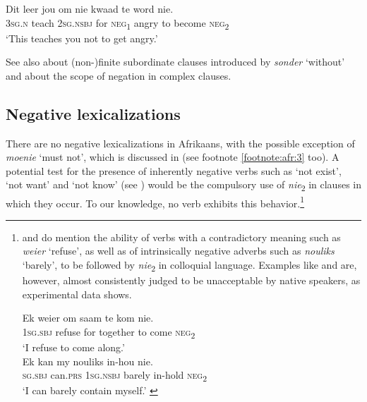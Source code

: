 \documentclass[output=paper,colorlinks,citecolor=brown]{langscibook}
\begin{document}
    \ex\label{ex:afr:23d}
        \gll Dit leer jou om nie kwaad te word nie. \\
             \textsc{3sg.n} teach 2\textsc{sg.nsbj} for    \textsc{neg}\textsubscript{1} angry to become \textsc{neg}\textsubscript{2}\\
        \glt ‘This teaches you not to get angry.’
    \z
\z 

See also  about (non-)finite subordinate clauses introduced by \textit{sonder} ‘without’ and  about the scope of negation in complex clauses. 

\subsection{Negative lexicalizations}

There are no negative lexicalizations in Afrikaans, with the possible exception of \textit{moenie} ‘must not’, which is discussed in  (see footnote \ref{footnote:afr:3} too).
A potential test for the presence of inherently negative verbs such as ‘not exist’, ‘not want’ and ‘not know’ (see \citealt{Veselinova2013lexicalization}) would be the compulsory use of \textit{nie}\textsubscript{2} in clauses in which they occur. To our knowledge, no verb exhibits this behavior.\footnote{\label{footnote:afr:8}\citet[79]{Oosthuizen1998} and \citet[116]{Biberauer2008} do mention the ability of verbs with a contradictory meaning such as \textit{weier} ‘refuse’, as well as of intrinsically negative adverbs such as \textit{nouliks} ‘barely’, to be followed by \textit{nie}\textsubscript{2} in colloquial language. Examples like  and  are, however, almost consistently judged to be unacceptable by native speakers, as  experimental data shows. 

\ea\label{ex:afr:i}
    \gll Ek weier om saam te kom nie.  \\
    \textsc{1sg.sbj} refuse  for  together  to  come \textsc{neg}\textsubscript{2} \\
    \glt ‘I refuse to come along.’ \citep[116]{Biberauer2008} \\
\ex\label{ex:afr:ii}
    \gll Ek kan my nouliks in-hou nie. \\
    \textsc{sg.sbj} can.\textsc{prs} \textsc{1sg.nsbj} barely in-hold \textsc{neg}\textsubscript{2} \\
    \glt ‘I can barely contain myself.’  \citep[116]{Biberauer2008}
\z
} %
\end{document}
